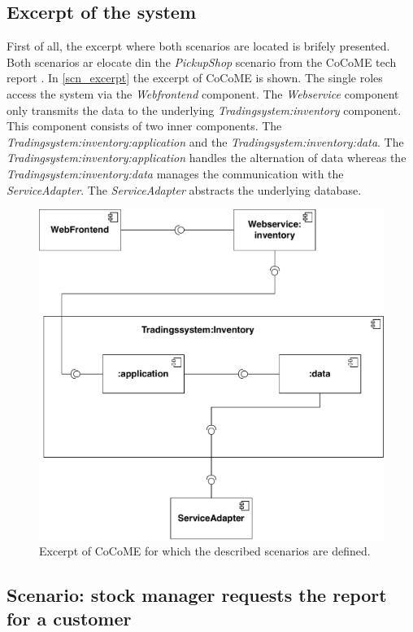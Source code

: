 \subsection{Excerpt of the system}
First of all, the excerpt where both scenarios are located is brifely presented. Both scenarios ar elocate din the \textit{PickupShop} scenario from the CoCoME tech report \cite{CoCoMETechReport}. In \autoref{scn_excerpt} the excerpt of CoCoME is shown. The single roles access the system via the \textit{Webfrontend} component. The \textit{Webservice} component only transmits the data to the underlying \textit{Tradingsystem:inventory} component. This component consists of two inner components. The \textit{Tradingsystem:inventory:application} and the \textit{Tradingsystem:inventory:data}. The \textit{Tradingsystem:inventory:application} handles the alternation of data whereas the \textit{Tradingsystem:inventory:data} manages the communication with the \textit{ServiceAdapter}. The \textit{ServiceAdapter} abstracts the underlying database.
\begin{figure}
\includegraphics[scale=0.8]{logos/ExcerptUC13.pdf}
\caption{Excerpt of CoCoME for which the described scenarios are defined.}
\label{scn_excerpt}
\end{figure}
\subsection{Scenario: stock manager requests the report for a customer}
\label{descripScn_casestudy_scn1} 
